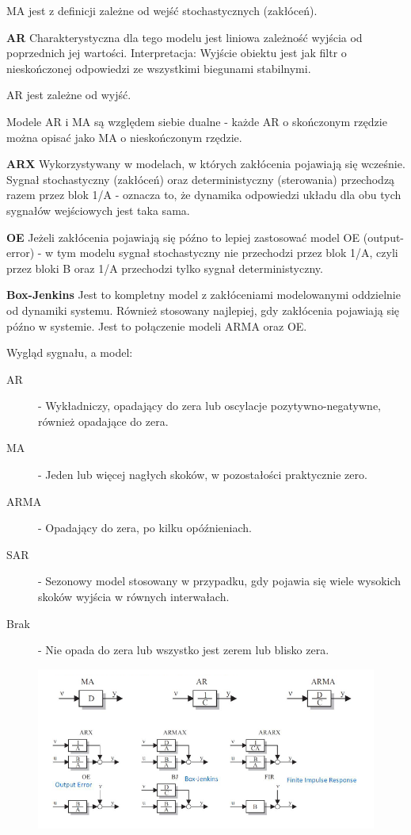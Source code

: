 MA jest z definicji zależne od wejść stochastycznych (zakłóceń).

\textbf{AR} Charakterystyczna dla tego modelu jest liniowa zależność wyjścia od poprzednich jej wartości. Interpretacja: Wyjście obiektu jest jak filtr o nieskończonej odpowiedzi ze wszystkimi biegunami stabilnymi.

AR jest zależne od wyjść.

Modele AR i MA są względem siebie dualne - każde AR o skończonym rzędzie można opisać jako MA o nieskończonym rzędzie.

\textbf{ARX} Wykorzystywany w modelach, w których zakłócenia pojawiają się wcześnie. Sygnał stochastyczny (zakłóceń) oraz deterministyczny (sterowania) przechodzą razem przez blok 1/A - oznacza to, że dynamika odpowiedzi układu dla obu tych sygnałów wejściowych jest taka sama.

\textbf{OE} Jeżeli zakłócenia pojawiają się późno to lepiej zastosować model OE (output-error) - w tym modelu sygnał stochastyczny nie przechodzi przez blok 1/A, czyli przez bloki B oraz 1/A przechodzi tylko sygnał deterministyczny.

\textbf{Box-Jenkins} Jest to kompletny model z zakłóceniami modelowanymi oddzielnie od dynamiki systemu. Również stosowany najlepiej, gdy zakłócenia pojawiają się późno w systemie. Jest to połączenie modeli ARMA oraz OE.

Wygląd sygnału, a model:
\begin{description}
    \item[AR] - Wykładniczy, opadający do zera lub oscylacje pozytywno-negatywne, również opadające do zera.
    \item[MA] - Jeden lub więcej nagłych skoków, w pozostałości praktycznie zero.
    \item[ARMA] - Opadający do zera, po kilku opóźnieniach.
    \item[SAR] - Sezonowy model stosowany w przypadku, gdy pojawia się wiele wysokich skoków wyjścia w równych interwałach.
    \item[Brak] - Nie opada do zera lub wszystko jest zerem lub blisko zera.
\end{description}


\begin{figure}[!h]
\includegraphics[width=\linewidth]{fig/Modele.png}
\end{figure}


